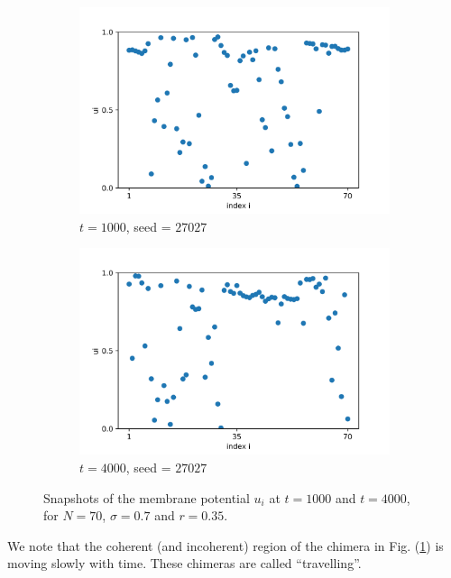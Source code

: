 \documentclass[a4paper,12pt]{article}
\begin{document}
\begin{figure}[H]
\begin{subfigure}{0.49 \textwidth}
\centering
\includegraphics[width=\linewidth]{u_seed=27027_t=1000.png}
\caption{$t=1000$, seed = $27027$}
\end{subfigure}
\hfill
\begin{subfigure}{0.49 \textwidth}
\centering
\includegraphics[width=\linewidth]{u_seed=27027_t=4000.png}
\caption{$t=4000$, seed = $27027$} 
\end{subfigure}
\caption{Snapshots of the membrane potential $u_i$ at $t=1000$ and $t=4000$, for $N=70$, $\sigma=0.7$ and $r=0.35$.}
\label{notrans}
\end{figure} 
\noindent We note that the coherent (and incoherent) region of the chimera in Fig. (\ref{notrans}) is moving slowly with time. These chimeras are called ``travelling''.
\end{document}
